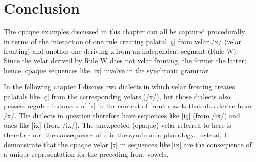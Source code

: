 \section{Conclusion}\label{sec:5.6}

The opaque examples discussed in this chapter can all be captured procedurally in terms of the interaction of one rule creating palatal [ç] from velar /x/ (velar fronting) and another one deriving {\textbar}x{\textbar} from an independent segment (Rule W). Since the velar derived by Rule W does not  velar fronting, the former  the latter; hence, opaque sequences like [ix] involve   in the synchronic grammar.

In the following chapter I discuss two dialects in which velar fronting creates palatals like [ç] from the corresponding velars (/x/), but those dialects also possess regular instances of [x] in the context of front vowels that also derive from /x/. The dialects in question therefore have sequences like [iç] (from /ix/) and ones like [ix] (from /ix/). The unexpected (opaque) velar referred to here is therefore not the consequence of a  in the synchronic phonology. Instead, I demonstrate that the opaque velar [x] in sequences like [ix] are the consequence of a unique representation for the preceding front vowels.
